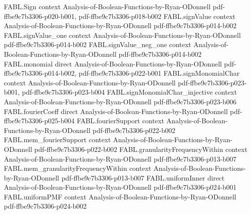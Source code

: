 \begin{theorem}
\label{FABL.FiniteFourierBasis.fourierCoeff_projectOnCoordinates}
\leanok
{}
\proofstep
  {FABL.Sign}
  {context}
  {Analysis-of-Boolean-Functions-by-Ryan-ODonnell}
  {pdf-ffbe9c7b3306-p020-b001,
    pdf-ffbe9c7b3306-p018-b002}
\proofstep
  {FABL.signValue}
  {context}
  {Analysis-of-Boolean-Functions-by-Ryan-ODonnell}
  {pdf-ffbe9c7b3306-p014-b002}
\proofstep
  {FABL.signValue_one}
  {context}
  {Analysis-of-Boolean-Functions-by-Ryan-ODonnell}
  {pdf-ffbe9c7b3306-p014-b002}
\proofstep
  {FABL.signValue_neg_one}
  {context}
  {Analysis-of-Boolean-Functions-by-Ryan-ODonnell}
  {pdf-ffbe9c7b3306-p014-b002}
\proofstep
  {FABL.monomial}
  {direct}
  {Analysis-of-Boolean-Functions-by-Ryan-ODonnell}
  {pdf-ffbe9c7b3306-p014-b002,
    pdf-ffbe9c7b3306-p022-b001}
\proofstep
  {FABL.signMonomialChar}
  {context}
  {Analysis-of-Boolean-Functions-by-Ryan-ODonnell}
  {pdf-ffbe9c7b3306-p023-b001,
    pdf-ffbe9c7b3306-p023-b004}
\proofstep
  {FABL.signMonomialChar_injective}
  {context}
  {Analysis-of-Boolean-Functions-by-Ryan-ODonnell}
  {pdf-ffbe9c7b3306-p023-b006}
\proofstep
  {FABL.fourierCoeff}
  {direct}
  {Analysis-of-Boolean-Functions-by-Ryan-ODonnell}
  {pdf-ffbe9c7b3306-p025-b004}
\proofstep
  {FABL.fourierSupport}
  {context}
  {Analysis-of-Boolean-Functions-by-Ryan-ODonnell}
  {pdf-ffbe9c7b3306-p022-b002}
\proofstep
  {FABL.mem_fourierSupport}
  {context}
  {Analysis-of-Boolean-Functions-by-Ryan-ODonnell}
  {pdf-ffbe9c7b3306-p022-b002}
\proofstep
  {FABL.granularityFrequencyWithin}
  {context}
  {Analysis-of-Boolean-Functions-by-Ryan-ODonnell}
  {pdf-ffbe9c7b3306-p013-b007}
\proofstep
  {FABL.mem_granularityFrequencyWithin}
  {context}
  {Analysis-of-Boolean-Functions-by-Ryan-ODonnell}
  {pdf-ffbe9c7b3306-p013-b007}
\proofstep
  {FABL.uniformInner}
  {direct}
  {Analysis-of-Boolean-Functions-by-Ryan-ODonnell}
  {pdf-ffbe9c7b3306-p024-b001}
\proofstep
  {FABL.uniformPMF}
  {context}
  {Analysis-of-Boolean-Functions-by-Ryan-ODonnell}
  {pdf-ffbe9c7b3306-p024-b002}

\end{theorem}
